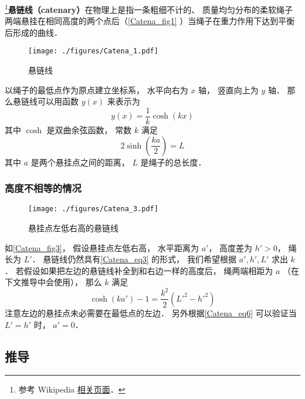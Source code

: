 

\footnote{参考 Wikipedia \href{https://en.wikipedia.org/wiki/Catenary}{相关页面}．}\textbf{悬链线（catenary）}在物理上是指一条粗细不计的、 质量均匀分布的柔软绳子两端悬挂在相同高度的两个点后（\autoref{Catena_fig1} ）当绳子在重力作用下达到平衡后形成的曲线．

\begin{figure}[ht]
\centering
\texttt{[image: ./figures/Catena\_1.pdf]}
\caption{悬链线} \label{Catena_fig1}
\end{figure}

以绳子的最低点作为原点建立坐标系， 水平向右为 $x$ 轴， 竖直向上为 $y$ 轴． 那么悬链线可以用函数 $y(x)$ 来表示为
\begin{equation}\label{Catena_eq3}
y(x) = \frac{1}{k}\cosh(kx)
\end{equation}
其中 $\cosh$ 是双曲余弦函数， 常数 $k$ 满足
\begin{equation}
2\sinh(\frac{ka}{2}) = L
\end{equation}
其中 $a$ 是两个悬挂点之间的距离， $L$ 是绳子的总长度．

\subsubsection{高度不相等的情况}
\begin{figure}[ht]
\centering
\texttt{[image: ./figures/Catena\_3.pdf]}
\caption{悬挂点左低右高的悬链线} \label{Catena_fig3}
\end{figure}
如\autoref{Catena_fig3}， 假设悬挂点左低右高， 水平距离为 $a'$， 高度差为 $h' > 0$， 绳长为 $L'$． 悬链线仍然具有\autoref{Catena_eq3} 的形式， 我们希望根据 $a', h', L'$ 求出 $k$． 若假设如果把左边的悬链线补全到和右边一样的高度后， 绳两端相距为 $a$ （在下文推导中会使用）， 那么 $k$ 满足
\begin{equation}\label{Catena_eq6}
\cosh(ka') - 1 = \frac{k^2}{2}(L'^2 - h'^2)
\end{equation}
注意左边的悬挂点未必需要在最低点的左边． 另外根据\autoref{Catena_eq6} 可以验证当 $L' = h'$ 时， $a' = 0$．

\subsection{推导}


